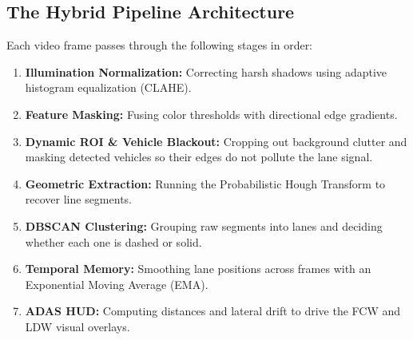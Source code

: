 \documentclass[a4paper, 11pt]{article}
\begin{document}
	\subsection{The Hybrid Pipeline Architecture}
	Each video frame passes through the following stages in order:
	\begin{enumerate}
		\item \textbf{Illumination Normalization:} Correcting harsh shadows using adaptive histogram equalization (CLAHE).
		\item \textbf{Feature Masking:} Fusing color thresholds with directional edge gradients.
		\item \textbf{Dynamic ROI \& Vehicle Blackout:} Cropping out background clutter and masking detected vehicles so their edges do not pollute the lane signal.
		\item \textbf{Geometric Extraction:} Running the Probabilistic Hough Transform to recover line segments.
		\item \textbf{DBSCAN Clustering:} Grouping raw segments into lanes and deciding whether each one is dashed or solid.
		\item \textbf{Temporal Memory:} Smoothing lane positions across frames with an Exponential Moving Average (EMA).
		\item \textbf{ADAS HUD:} Computing distances and lateral drift to drive the FCW and LDW visual overlays.
	\end{enumerate}
	
\end{document}
